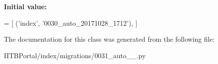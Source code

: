 {\bfseries Initial value\+:}
\begin{DoxyCode}
=  [
        (\textcolor{stringliteral}{'index'}, \textcolor{stringliteral}{'0030\_auto\_20171028\_1712'}),
    ]
\end{DoxyCode}


The documentation for this class was generated from the following file\+:\begin{DoxyCompactItemize}
\item 
I\+I\+T\+B\+Portal/index/migrations/0031\+\_\+auto\+\_\+\_.\+py\end{DoxyCompactItemize}
